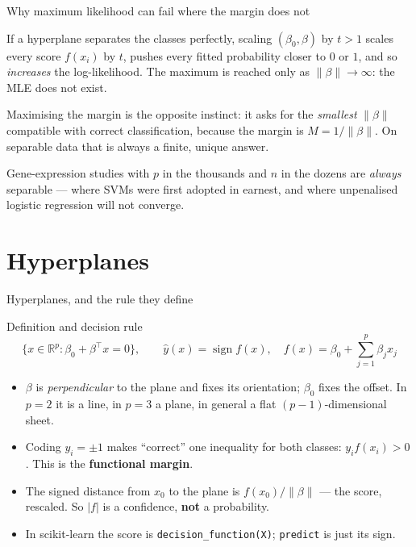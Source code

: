 \documentclass[aspectratio=169,11pt]{beamer}
\begin{document}
\begin{frame}{Why maximum likelihood can fail where the margin does not}
  \footnotesize
  \begin{numexample}
    If a hyperplane separates the classes perfectly, scaling $(\beta_0,\beta)$
    by $t>1$ scales every score $f(x_i)$ by $t$, pushes every fitted
    probability closer to $0$ or $1$, and so \emph{increases} the
    log-likelihood. The maximum is reached only as $\|\beta\|\to\infty$: the
    MLE does not exist.
  \end{numexample}
  \begin{takeaway}
    Maximising the margin is the opposite instinct: it asks for the
    \emph{smallest} $\|\beta\|$ compatible with correct classification, because
    the margin is $M=1/\|\beta\|$. On separable data that is always a finite,
    unique answer.
  \end{takeaway}
  \begin{industry}
    Gene-expression studies with $p$ in the thousands and $n$ in the dozens are
    \emph{always} separable --- where SVMs were first adopted in earnest, and
    where unpenalised logistic regression will not converge.
  \end{industry}
\end{frame}

\section{Hyperplanes}

\begin{frame}{Hyperplanes, and the rule they define}
  \footnotesize
  \begin{block}{Definition and decision rule}
    \[
      \boxed{\;\{x \in \mathbb{R}^p : \beta_0 + \beta^\top x = 0\},
      \qquad
      \hat y(x)=\operatorname{sign} f(x), \quad
      f(x)=\beta_0+\textstyle\sum_{j=1}^p \beta_j x_j \;}
    \]
  \end{block}
  \begin{readme}
    \begin{itemize}
      \item $\beta$ is \emph{perpendicular} to the plane and fixes its
            orientation; $\beta_0$ fixes the offset. In $p=2$ it is a line, in
            $p=3$ a plane, in general a flat $(p-1)$-dimensional sheet.
      \item Coding $y_i=\pm1$ makes ``correct'' one inequality for both
            classes: $y_i f(x_i) > 0$. This is the \textbf{functional margin}.
      \item The signed distance from $x_0$ to the plane is $f(x_0)/\|\beta\|$
            --- the score, rescaled. So $|f|$ is a confidence, \textbf{not} a
            probability.
      \item In scikit-learn the score is \texttt{decision\_function(X)};
            \texttt{predict} is just its sign.
    \end{itemize}
  \end{readme}
\end{frame}
\end{document}
